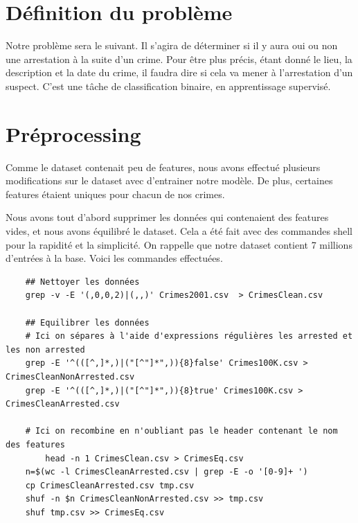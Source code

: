\documentclass{article}
\begin{document}
    \section{Définition du problème}
    Notre problème sera le suivant. Il s'agira de déterminer si il y aura
    oui ou non une arrestation à la suite d'un crime. 
    Pour être plus précis, étant donné le lieu, la description et la date du crime, 
    il faudra dire si cela va mener à l'arrestation d'un suspect.
    C'est une tâche de classification
    binaire, en apprentissage supervisé.

    \section{Préprocessing}
    Comme le dataset contenait peu de features, 
    nous avons effectué plusieurs modifications sur le dataset avec d'entrainer notre modèle.
    De plus, certaines features étaient uniques pour chacun de nos crimes.

    Nous avons tout d'abord supprimer les données qui contenaient des features vides, et nous avons
    équilibré le dataset.
    Cela a été fait avec des commandes shell pour la rapidité et la simplicité. On rappelle que notre dataset contient 7 millions d'entrées à la base.
    Voici les commandes effectuées.

    \begin{Verbatim}
	## Nettoyer les données
	grep -v -E '(,0,0,2)|(,,)' Crimes2001.csv  > CrimesClean.csv
	
	## Equilibrer les données
	# Ici on sépares à l'aide d'expressions régulières les arrested et les non arrested
	grep -E '^(([^,]*,)|("[^"]*",)){8}false' Crimes100K.csv > CrimesCleanNonArrested.csv
	grep -E '^(([^,]*,)|("[^"]*",)){8}true' Crimes100K.csv > CrimesCleanArrested.csv
	
	# Ici on recombine en n'oubliant pas le header contenant le nom des features
    	head -n 1 CrimesClean.csv > CrimesEq.csv
	n=$(wc -l CrimesCleanArrested.csv | grep -E -o '[0-9]+ ')
	cp CrimesCleanArrested.csv tmp.csv
	shuf -n $n CrimesCleanNonArrested.csv >> tmp.csv
	shuf tmp.csv >> CrimesEq.csv
\end{Verbatim}
\end{document}
